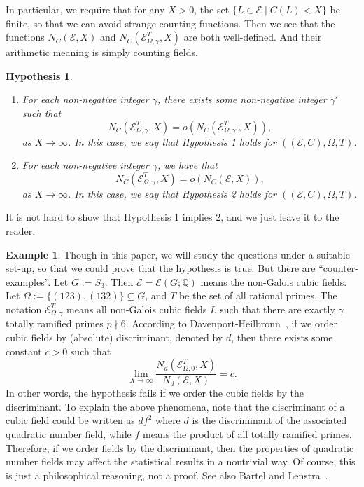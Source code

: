 \documentclass{amsart}
\numberwithin{equation}{section}
\theoremstyle{plain}
\newtheorem{hypothesis}[theorem]{Hypothesis}
\theoremstyle{definition}
\newtheorem{example}[theorem]{Example}
\theoremstyle{remark}
\begin{document}
In particular, we require that for any $X>0$, the set $\{L\in\mathcal{E}\mid C(L)<X\}$ be finite, so that we can avoid strange counting functions.
Then we see that the functions $N_{C}(\mathcal{E},X)$ and $N_{C}(\mathcal{E}_{\Omega,\gamma}^{T},X)$ are both well-defined.
And their arithmetic meaning is simply counting fields.
\begin{hypothesis}\label{hypothesis: comparison between field counting results}
	\begin{enumerate}
		\item For each non-negative integer $\gamma$, there exists some non-negative integer $\gamma'$ such that
		\begin{equation*}
			N_{C}(\mathcal{E}_{\Omega,\gamma}^{T},X)=o(N_{C}(\mathcal{E}_{\Omega,\gamma'}^{T},X)),
		\end{equation*}
		as $X\to\infty$.
		In this case, we say that Hypothesis 1 holds for $((\mathcal{E},C),\Omega,T)$.
		\item For each non-negative integer $\gamma$, we have that
		\begin{equation*}
			N_{C}(\mathcal{E}_{\Omega,\gamma}^{T},X)=o(N_{C}(\mathcal{E},X)),
		\end{equation*}
		as $X\to\infty$.
		In this case, we say that Hypothesis 2 holds for $((\mathcal{E},C),\Omega,T)$.
	\end{enumerate}
\end{hypothesis}
It is not hard to show that Hypothesis 1 implies 2, and we just leave it to the reader.
\begin{example}
	Though in this paper, we will study the questions under a suitable set-up, so that we could prove that the hypothesis is true.
	But there are ``counter-examples''.
	Let $G:=S_3$.
	Then $\mathcal{E}=\mathcal{E}(G;\mathbb{Q})$ means the non-Galois cubic fields.
	Let $\Omega:=\{(123),(132)\}\subseteq G$, and $T$ be the set of all rational primes.
	The notation $\mathcal{E}_{\Omega,\gamma}^T$ means all non-Galois cubic fields $L$ such that there are exactly $\gamma$ totally ramified primes $p\nmid6$.
	According to Davenport-Heilbronn~\cite{Davenport1971Cubic}, if we order cubic fields by (absolute) discriminant, denoted by $d$, then there exists some constant $c>0$ such that
	\begin{equation*}
		\lim_{X\to\infty}\frac{N_{d}(\mathcal{E}_{\Omega,0}^T,X)}{N_d(\mathcal{E},X)}=c.
	\end{equation*}
	In other words, the hypothesis fails if we order the cubic fields by the discriminant.
	To explain the above phenomena, note that the discriminant of a cubic field could be written as $df^2$ where $d$ is the discriminant of the associated quadratic number field, while $f$ means the product of all totally ramified primes.
	Therefore, if we order fields by the discriminant, then the properties of quadratic number fields may affect the statistical results in a nontrivial way.
	Of course, this is just a philosophical reasoning, not a proof.
	See also Bartel and Lenstra~\cite{bartel2020class}.
\end{example}
\end{document}

